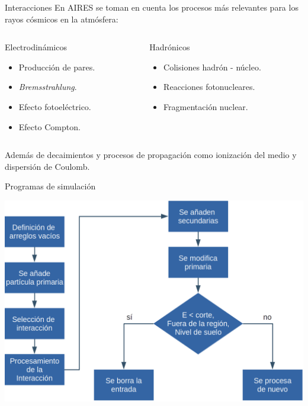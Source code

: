 \documentclass[10pt,xcolor=table]{beamer}
\begin{document}
\begin{frame}{Interacciones}
\vspace{\fill}
En AIRES se toman en cuenta los procesos m\'as relevantes para los rayos c\'osmicos en la atm\'osfera: \vspace{0.5 cm}
	\begin{columns}
		\begin{column}{0.5\textwidth}
			\begin{block}{Electrodin\'amicos}
				\begin{itemize}
				\item Producci\'on de pares.
				\item \textit{Bremsstrahlung}.
				\item Efecto fotoel\'ectrico.
				\item Efecto Compton.
				\end{itemize}
			\end{block}
		\end{column}
		\begin{column}{0.5\textwidth}
			\begin{block}{Hadr\'onicos}
			\vspace{0.225 cm}
				\begin{itemize}
				\item Colisiones hadr\'on - n\'ucleo.
				\item Reacciones fotonucleares.
				\item Fragmentaci\'on nuclear.
				\end{itemize}
			\vspace{0.255 cm}
			\end{block}
		\end{column}
	\end{columns}
	\vspace{0.5 cm}
	Adem\'as de decaimientos y procesos de propagaci\'on como ionizaci\'on del medio y dispersi\'on de Coulomb.
	\vspace{\fill}
\end{frame}

\begin{frame}{Programas de simulaci\'on}
\vspace{\fill}
	\begin{center}
	\includegraphics[width=1\textwidth]{Figuras/programdiagram}
	\end{center}
\vspace{\fill}
\end{frame}
\end{document}
